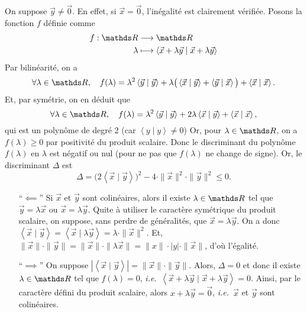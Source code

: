 \begin{prv}
	On suppose $\vec{y}\neq \vec{0}$. En effet, si $\vec{x} = \vec{0}$, l'inégalité est clairement vérifiée.
	Posons la fonction $f$\/ définie comme \begin{align*}
		f: \R &\longrightarrow \R \\
		\lambda &\longmapsto  \left<\vec{x} + \lambda \vec{y}  \mid \vec{x}+\lambda \vec{y} \right>
	\end{align*}
	Par bilinéarité, on a \[
		\forall \lambda \in \R,\quad f(\lambda) = \lambda^2 \left<\vec{y}  \mid \vec{y} \right> + \lambda\big(\left<\vec{x}  \mid \vec{y} \right> + \left<\vec{y}  \mid \vec{x} \right>\big) + \left<\vec{x}  \mid \vec{x} \right>
	.\] Et, par symétrie, on en déduit que \[
		\forall \lambda \in \R,\quad f(\lambda) = \lambda^2 \left<\vec{y} \mid \vec{y} \right> + 2\lambda \left<\vec{x} \mid \vec{y} \right> + \left<\vec{x} \mid \vec{x} \right>,
	\] qui est un polynôme de degré 2 (car $\left<y \mid y \right> \neq 0$) Or, pour $\lambda \in \R$, on a $f(\lambda) \ge 0$\/ par positivité du produit scalaire. Donc le discriminant du polynôme $f(\lambda)$\/ en $\lambda$\/ est négatif ou nul (pour ne pas que $f(\lambda)$\/ ne change de signe). Or, le discriminant $\Delta$\/ est \[
		\Delta = \big(2\left<\vec{x} \mid \vec{y} \right>\big)^2 - 4 \cdot  \|\vec{x}\|^2\cdot \|\vec{y}\|^2 \le 0.
	\]

	\begin{itemize}
		\item[``$\impliedby$''] Si $\vec{x}$\/ et $\vec{y}$\/ sont colinéaires, alors il existe $\lambda \in \R$\/ tel que $\vec{y} = \lambda \vec{x}$\/ ou $\vec{x} = \lambda \vec{y}$. Quite à utiliser le caractère symétrique du produit scalaire, on suppose, sans perdre de généralités, que $\vec{x} = \lambda \vec{y}$. On a donc $\left<\vec{x}  \mid \vec{y} \right> = \left<\vec{x}  \mid \lambda \vec{y} \right> = \lambda \cdot \|\vec{x}\|^2$. Et, $\|\vec{x}\|\cdot \|\vec{y}\| = \|\vec{x}\| \cdot \|\lambda \vec{x}\| = \|x\|\cdot |y|\cdot \|\vec{x}\|$, d'où l'égalité.
		\item[``$\implies$''] On suppose $|\left<\vec{x} \mid \vec{y} \right>| = \|\vec{x}\| \cdot \|\vec{y}\|$. Alors, $\Delta = 0$\/ et donc il existe $\lambda \in \R$\/ tel que $f(\lambda) = 0$, \textit{i.e.}\ $\left<\vec{x} + \lambda \vec{y}  \mid \vec{x} + \lambda \vec{y} \right> = 0$. Ainsi, par le caractère défini du produit scalaire, alors $x + \lambda \vec{y} = \vec{0}$, \textit{i.e.}\ $\vec{x}$\/ et $\vec{y}$\/ sont colinéaires.
	\end{itemize}
\end{prv}

